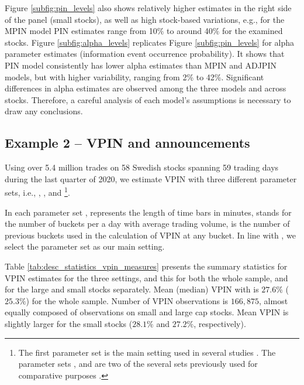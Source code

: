  Figure \ref{subfig:pin_levels} also shows relatively higher estimates in the right side of the panel (small stocks), as well as high stock-based variations, e.g., for the MPIN model PIN estimates range from 10$\%$ to around 40$\%$ for the examined stocks. 
 Figure \ref{subfig:alpha_levels} replicates Figure \ref{subfig:pin_levels} for alpha parameter estimates (information event occurrence probability).  It shows that PIN model consistently has lower alpha estimates than MPIN and ADJPIN models, but with higher variability, ranging from 2\% to 42\%. Significant differences in alpha estimates are observed among the three models and across stocks. Therefore, a careful analysis of each model's assumptions is necessary to draw any conclusions.

\subsection{Example 2 – VPIN and announcements}

Using over 5.4 million trades on 58 Swedish stocks spanning 59 trading days during the last quarter of 2020, we estimate VPIN with three different parameter sets, i.e., , , and  \footnote{The first parameter set  is the main setting used in several studies \citep[see e.g.][]{Easley2011microstructure, Easley2012Flow, Abad2012From}. The parameter sets , and  are two of the several sets previously used for comparative purposes \citep[see e.g.][]{Abad2012From}.}.

In each parameter set ,  represents the length of time bars in minutes,  stands for the number of buckets per a day with average trading volume,  is the number of previous buckets used in the calculation of VPIN at any bucket. In line with \cite{Easley2011microstructure,Easley2012Flow}, we select the  parameter set  as our main setting.

Table \ref{tab:desc_statistics_vpin_measures} presents the summary statistics for VPIN estimates for the three settings, and this for both the whole sample, and for the large and small stocks separately. 
Mean (median) VPIN with  is \( 27.6\%\) (\( 25.3\%\)) for the whole sample. Number of VPIN observations is \(166,875\), almost equally composed of observations on small and large cap stocks. Mean VPIN is slightly larger for the small stocks (\(28.1\%\) and \(27.2\%\), respectively). 



